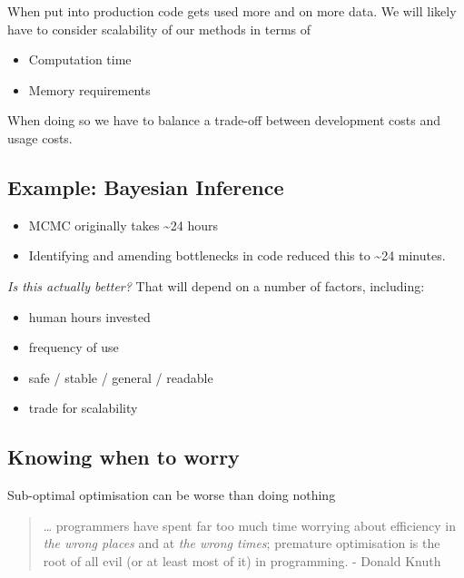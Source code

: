 \documentclass[
  letterpaper,
  DIV=11,
  numbers=noendperiod]{scrreprt}
\providecommand{\tightlist}{%
  \setlength{\itemsep}{0pt}\setlength{\parskip}{0pt}}\usepackage{longtable,booktabs,array}
\begin{document}
When put into production code gets used more and on more data. We will
likely have to consider scalability of our methods in terms of

\begin{itemize}
\item
  Computation time
\item
  Memory requirements
\end{itemize}

When doing so we have to balance a trade-off between development costs
and usage costs.

\subsection{Example: Bayesian
Inference}\label{example-bayesian-inference}

\begin{itemize}
\item
  MCMC originally takes \textasciitilde24 hours
\item
  Identifying and amending bottlenecks in code reduced this to
  \textasciitilde24 minutes.
\end{itemize}

\emph{Is this actually better?} That will depend on a number of factors,
including:

\begin{itemize}
\tightlist
\item
  human hours invested
\item
  frequency of use
\item
  safe / stable / general / readable
\item
  trade for scalability
\end{itemize}

\subsection{Knowing when to worry}\label{knowing-when-to-worry}

Sub-optimal optimisation can be worse than doing nothing

\begin{quote}
\ldots{} programmers have spent far too much time worrying about
efficiency in \emph{the wrong places} and at \emph{the wrong times};
premature optimisation is the root of all evil (or at least most of it)
in programming. - Donald Knuth
\end{quote}
\end{document}
